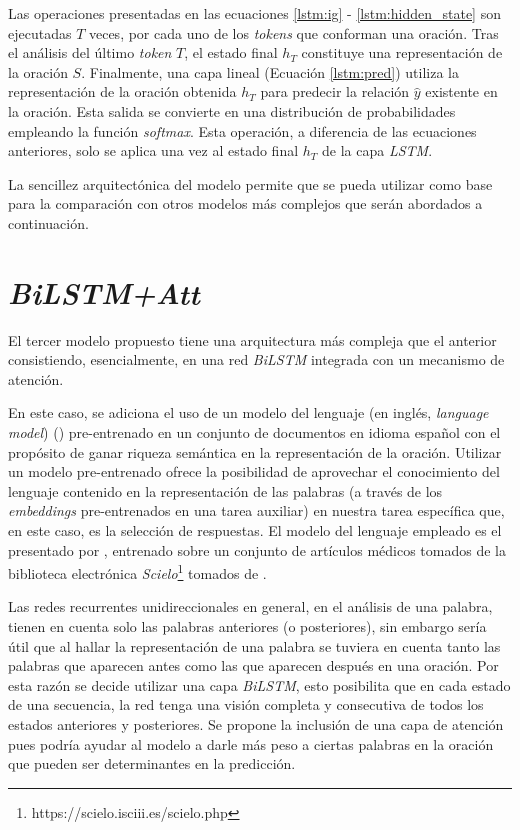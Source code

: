 Las operaciones presentadas en las ecuaciones \ref{lstm:ig} - \ref{lstm:hidden_state} son ejecutadas $T$ veces, por cada uno de los \textit{tokens} que conforman una oración. Tras el análisis del último \textit{token} $T$, el estado final $h_{T}$ constituye una representación de la oración $S$. Finalmente, una capa lineal (Ecuación \ref{lstm:pred}) utiliza la representación de la oración obtenida $h_{T}$ para predecir la relación $\hat{y}$ existente en la oración. Esta salida se convierte en una distribución de probabilidades empleando la función \textit{softmax}. Esta operación, a diferencia de las ecuaciones anteriores, solo se aplica una vez al estado final $h_{T}$ de la capa \textit{LSTM}.

La sencillez arquitectónica del modelo permite que se pueda utilizar como base para la comparación con otros modelos más complejos que serán abordados a continuación.

\section{\textit{BiLSTM+Att}}\label{bilstm_t}

El tercer modelo propuesto tiene una arquitectura más compleja que el anterior consistiendo, esencialmente, en una red \textit{BiLSTM} integrada con un mecanismo de atención.

En este caso, se adiciona el uso de un modelo del lenguaje (en inglés, \textit{language model})  (\cite{mikolov-2016-fastext}) pre-entrenado en un conjunto de documentos en idioma español con el propósito de ganar riqueza semántica en la representación de la oración. Utilizar un modelo pre-entrenado ofrece la posibilidad de aprovechar el conocimiento del lenguaje contenido en la representación de las palabras (a través de los \textit{embeddings} pre-entrenados en una tarea auxiliar) en nuestra tarea específica que, en este caso, es la selección de respuestas. El modelo del lenguaje empleado es el presentado por \cite{mikolov-2016-fastext}, entrenado sobre un conjunto de artículos médicos tomados de la biblioteca electrónica \textit{Scielo}\footnote{https://scielo.isciii.es/scielo.php} tomados de \cite{2019-medical-fastext}.

Las redes recurrentes unidireccionales en general, en el análisis de una palabra, tienen en cuenta solo las palabras anteriores (o posteriores), sin embargo sería útil que al hallar la representación de una palabra se tuviera en cuenta tanto las palabras que aparecen antes como las que aparecen después en una oración. Por esta razón se decide utilizar una capa \textit{BiLSTM}, esto posibilita que en cada estado de una secuencia, la red tenga una visión completa y consecutiva de todos los estados anteriores y posteriores. Se propone la inclusión de una capa de atención pues podría ayudar al modelo a darle más peso a ciertas palabras en la oración que pueden ser determinantes en la predicción.

